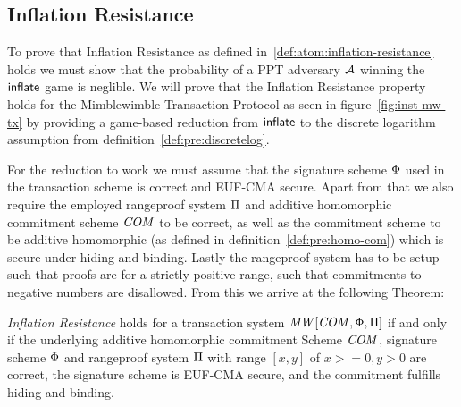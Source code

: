 \subsection{Inflation Resistance} \label{subsec:atom:prf-inflation-resistance}

To prove that Inflation Resistance as defined in~\ref{def:atom:inflation-resistance} holds we must show that the probability of a PPT adversary $\mathcal{A}$ winning the $\mathsf{inflate}$ game is neglible.
We will prove that the Inflation Resistance property holds for the Mimblewimble Transaction Protocol as seen in figure~\ref{fig:inst-mw-tx} by providing a game-based reduction from $\mathsf{inflate}$ to the discrete logarithm assumption from definition~\ref{def:pre:discretelog}.

For the reduction to work we must assume that the signature scheme $\Phi$ used in the transaction scheme is correct and EUF-CMA secure.
Apart from that we also require the employed rangeproof system $\Pi$ and additive homomorphic commitment scheme $\mathit{COM}$ to be correct, as well as the commitment scheme to be additive homomorphic (as defined in definition~\ref{def:pre:homo-com}) which is secure under hiding and binding.
Lastly the rangeproof system has to be setup such that proofs are for a strictly positive range, such that commitments to negative numbers are disallowed.
From this we arrive at the following Theorem:

\begin{theorem}\label{theo:atom:infl-resistence}
\emph{Inflation Resistance} holds for a transaction system $\mathit{MW}[\mathit{COM},\Phi,\Pi]$ if and only if the underlying additive homomorphic commitment Scheme $\mathit{COM}$, signature scheme $\Phi$ and rangeproof system $\Pi$ with range $[x,y]$ of $x >= 0, y > 0$ are correct, the signature scheme is EUF-CMA secure, and the commitment fulfills hiding and binding.
\end{theorem}

